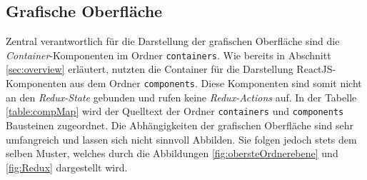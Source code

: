\subsection{Grafische Oberfläche}

Zentral verantwortlich für die Darstellung der grafischen Oberfläche sind die \emph{Container}-Komponenten im Ordner \lstinline|containers|. Wie bereits in  Abschnitt \ref{sec:overview} erläutert, nutzten die Container für die Darstellung ReactJS-Komponenten aus dem Ordner \lstinline|components|.
Diese Komponenten sind somit nicht an den \emph{Redux-State} gebunden und rufen keine \emph{Redux-Actions} auf.
In der Tabelle \ref{table:compMap} wird der Quelltext der Ordner \lstinline|containers| und \lstinline|components| Bausteinen zugeordnet. Die Abhängigkeiten der grafischen Oberfläche sind sehr umfangreich und lassen sich nicht sinnvoll Abbilden. Sie folgen jedoch stets dem selben Muster, welches durch die Abbildungen \ref{fig:obersteOrdnerebene} und \ref{fig:Redux} dargestellt wird.

